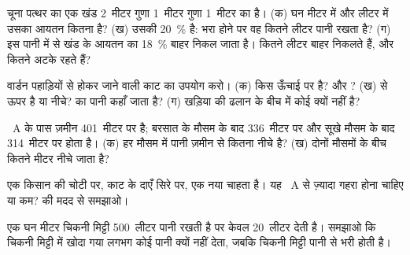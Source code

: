 \begin{exercise}[$\star\star$]\label{exo:g6:water-underground:6}
चूना पत्थर का एक खंड 2~मीटर गुणा 1~मीटर गुणा 1~मीटर का है। (क) घन मीटर में और
लीटर में उसका आयतन कितना है? (ख) उसकी  20~\% है: भरा होने पर वह कितने
लीटर पानी रखता है? (ग) इस पानी में से खंड के आयतन का 18~\% बाहर निकल जाता है।
कितने लीटर बाहर निकलते हैं, और कितने अटके रहते हैं?
\end{exercise}

\begin{exercise}[$\star\star$]\label{exo:g6:water-underground:7}
वार्डन पहाड़ियों से होकर जाने वाली काट का उपयोग करो। (क)  किस ऊँचाई पर
है? और ? (ख)   से ऊपर है या नीचे?  का पानी कहाँ जाता है?
(ग) खड़िया की  ढलान के बीच में कोई  क्यों नहीं है?
\end{exercise}

\begin{exercise}[$\star\star$]\label{exo:g6:water-underground:8}
~A के पास ज़मीन 401~मीटर पर है;  बरसात के मौसम के बाद 336~मीटर पर
और सूखे मौसम के बाद 314~मीटर पर होता है। (क) हर मौसम में पानी ज़मीन से कितना
नीचे है? (ख) दोनों मौसमों के बीच  कितने मीटर नीचे जाता
है?
\end{exercise}

\begin{exercise}[$\star\star$]\label{exo:g6:water-underground:9}
एक किसान  की चोटी पर, काट के दाएँ सिरे पर, एक नया  चाहता है। यह 
~A से ज़्यादा गहरा होना चाहिए या कम?  की मदद से
समझाओ।
\end{exercise}

\begin{exercise}[$\star\star$]\label{exo:g6:water-underground:10}
एक घन मीटर चिकनी मिट्टी 500~लीटर पानी रखती है पर केवल 20~लीटर देती है।
समझाओ कि चिकनी मिट्टी में खोदा गया  लगभग कोई पानी क्यों नहीं देता, जबकि
चिकनी मिट्टी पानी से भरी होती है।
\end{exercise}


